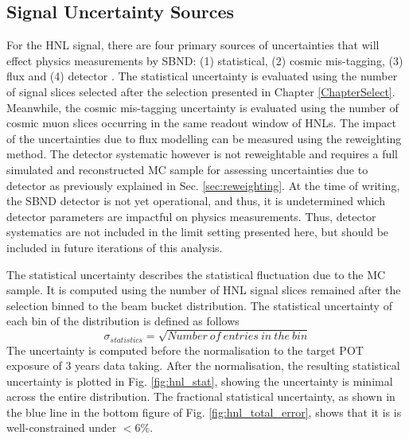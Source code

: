 \subsection{Signal Uncertainty Sources}
\label{sec:signal_error}

For the HNL signal, there are four primary sources of uncertainties that will effect physics measurements by SBND: (1) statistical, (2) cosmic mis-tagging, (3) flux and (4) detector . 
The statistical uncertainty is evaluated using the number of signal slices selected after the selection presented in Chapter \ref{ChapterSelect}.
Meanwhile, the cosmic mis-tagging uncertainty is evaluated using the number of cosmic muon slices occurring in the same readout window of HNLs.
The impact of the uncertainties due to flux modelling can be measured using the reweighting method.
The detector systematic however is not reweightable and requires a full simulated and reconstructed MC sample for assessing uncertainties due to detector as previously explained in Sec. \ref{sec:reweighting}.
At the time of writing, the SBND detector is not yet operational, and thus, it is undetermined which detector parameters are impactful on physics measurements.
Thus, detector systematics are not included in the limit setting presented here, but should be included in future iterations of this analysis.

The statistical uncertainty describes the statistical fluctuation due to the MC sample.
It is computed using the number of HNL signal slices remained after the selection binned to the beam bucket distribution.
The statistical uncertainty of each bin of the distribution is defined as follows 
\begin{equation}
\label{eq:stat_err}
    \sigma_{statistics} = \sqrt{Number\ of\ entries\ in\ the\ bin}
\end{equation}
The uncertainty is computed before the normalisation to the target POT exposure of 3 years data taking.
After the normalisation, the resulting statistical uncertainty is plotted in Fig. \ref{fig:hnl_stat}, showing the uncertainty is minimal across the entire distribution.
The fractional statistical uncertainty, as shown in the blue line in the bottom figure of Fig. \ref{fig:hnl_total_error}, shows that it is is well-constrained under $< 6\%$.

